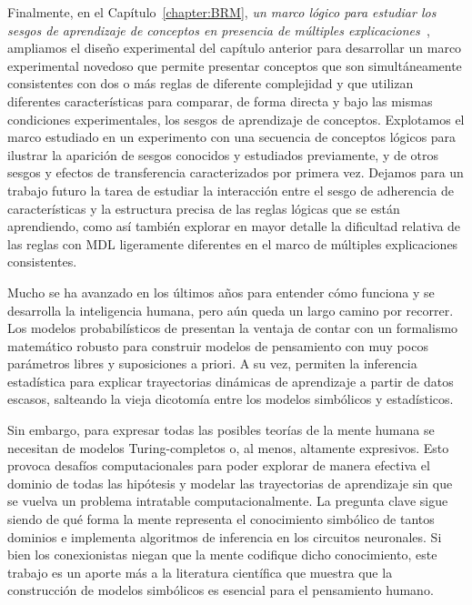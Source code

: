 Finalmente, en el Capítulo~\ref{chapter:BRM}, \textit{un marco lógico para estudiar los sesgos de aprendizaje de conceptos en presencia de múltiples explicaciones~\cite{tano2021framework}}, ampliamos el diseño experimental del capítulo anterior para desarrollar un marco experimental novedoso que permite presentar conceptos que son simultáneamente consistentes con dos o más reglas de diferente complejidad y que utilizan diferentes características para comparar, de forma directa y bajo las mismas condiciones experimentales, los sesgos de aprendizaje de conceptos. Explotamos el marco estudiado en un experimento con una secuencia de conceptos lógicos para ilustrar la aparición de sesgos conocidos y estudiados previamente, y de otros sesgos y efectos de transferencia caracterizados por primera vez. Dejamos para un trabajo futuro la tarea de estudiar la interacción entre el sesgo de adherencia de características y la estructura precisa de las reglas lógicas que se están aprendiendo, como así también explorar en mayor detalle la dificultad relativa de las reglas con MDL ligeramente diferentes en el marco de múltiples explicaciones consistentes.

\bigskip

Mucho se ha avanzado en los últimos años para entender cómo funciona y se desarrolla la inteligencia humana, pero aún queda un largo camino por recorrer. Los modelos probabilísticos de \lot presentan la ventaja de contar con un formalismo matemático robusto para construir modelos de pensamiento con muy pocos parámetros libres y suposiciones a priori. A su vez, permiten la inferencia estadística para explicar trayectorias dinámicas de aprendizaje a partir de datos escasos, salteando la vieja dicotomía entre los modelos simbólicos y estadísticos.

Sin embargo, para expresar todas las posibles teorías de la mente humana se necesitan de modelos \lot Turing-completos o, al menos, altamente expresivos. Esto provoca desafíos computacionales para poder explorar de manera efectiva el dominio de todas las hipótesis y modelar las trayectorias de aprendizaje sin que se vuelva un problema intratable computacionalmente. La pregunta clave sigue siendo de qué forma la mente representa el conocimiento simbólico de tantos dominios e implementa algoritmos de inferencia en los circuitos neuronales. Si bien los conexionistas niegan que la mente codifique dicho conocimiento, este trabajo es un aporte más a la literatura científica que muestra que la construcción de modelos simbólicos es esencial para el pensamiento humano.